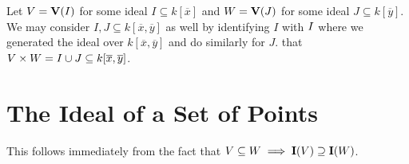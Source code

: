 \documentclass[letterpaper, 11pt, oneside]{book}
\begin{document}
\begin{sol}\label{ex:Curves_1.14}
\end{sol}

\begin{sol}\label{ex:Curves_1.15}
  Let $V = \operatorname{\mathbf{V}}(I)$ for some ideal $I \subseteq k[\overline{x}]$ and $W = \operatorname{\mathbf{V}}(J)$ for some ideal $J \subseteq k[\overline{y}]$.
  We may consider $I, J \subseteq k[\overline{x}, \overline{y}]$ as well by identifying $I$ with $\ideal{I}$ where we generated the ideal over $k[\overline{x}, \overline{y}]$ and do similarly for $J$.
   that $V \times W = \ideal{I \cup J} \subseteq k[\overline{x}, \overline{y}]$.
\end{sol}

\clearpage

\section{The Ideal of a Set of Points}

\begin{sol}\label{ex:Curves_1.16}
  This follows immediately from the fact that $V \subseteq W \implies \operatorname{\mathbf{I}}(V) \supseteq \operatorname{\mathbf{I}}(W)$.
\end{sol}
\end{document}
